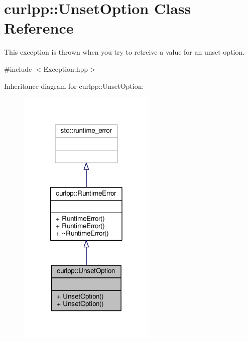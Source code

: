 \hypertarget{classcurlpp_1_1UnsetOption}{\section{curlpp\-:\-:Unset\-Option Class Reference}
\label{classcurlpp_1_1UnsetOption}
}


This exception is thrown when you try to retreive a value for an unset option.  




{\ttfamily \#include $<$Exception.\-hpp$>$}



Inheritance diagram for curlpp\-:\-:Unset\-Option\-:\nopagebreak
\begin{figure}[H]
\begin{center}
\leavevmode
\includegraphics[width=186pt]{classcurlpp_1_1UnsetOption__inherit__graph}
\end{center}
\end{figure}



